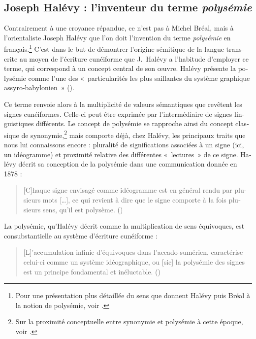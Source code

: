 \documentclass[french,output=paper,colorlinks,citecolor=brown]{../langscibook}
\begin{document}
\begin{otherlanguage}{french}
\subsection{Joseph Halévy : l’inventeur du terme \textit{polysémie}}

Contrairement à une croyance répandue, ce n’est pas à Michel Bréal, mais à l’orientaliste Joseph Halévy que l’on doit l’invention du terme \textit{polysémie} en français.\footnote{Pour une présentation plus détaillée du sens que donnent Halévy puis Bréal à la notion de polysémie, voir \citet[5–7]{Courbon2015}.} C’est dans le but de démontrer l’origine sémitique de la langue transcrite au moyen de l’écriture cunéiforme que J.~Halévy a l’habitude d’employer ce terme, qui correspond à un concept central de son œuvre. Halévy présente la polysémie comme l’une des «~particularités les plus saillantes du système graphique assyro-babylonien~» (\citealt[298]{Halévy1876}).

Ce terme renvoie alors à la multiplicité de valeurs sémantiques que revêtent les signes cunéiformes. Celle-ci peut être exprimée par l’intermédiaire de signes linguistiques différents. Le concept de polysémie se rapproche ainsi du concept classique de synonymie,\footnote{Sur la proximité conceptuelle entre synonymie et polysémie à cette époque, voir \citet{Delesalle1986}.} mais comporte déjà, chez Halévy, les principaux traits que nous lui connaissons encore : pluralité de significations associées à un signe (ici, un idéogramme) et proximité relative des différentes «~lectures~» de ce signe. Halévy décrit sa conception de la polysémie dans une communication donnée en 1878 :

\begin{quote}
[C]haque signe envisagé comme idéogramme est en général rendu par plusieurs mots […], ce qui revient à dire que le signe comporte à la fois plusieurs sens, qu’il est polysème. (\citealt[275]{Halévy1883})
\end{quote}

La polysémie, qu’Halévy décrit comme la multiplication de sens équivoques, est consubstantielle au système d’écriture cunéiforme :

\begin{quote}
    [L]’accumulation infinie d’équivoques dans l’accado-sumérien, caractérise celui-ci comme un système idéographique, ou [sic] la polysémie des signes est un principe fondamental et inéluctable. (\citealt[276]{Halévy1883})
\end{quote}


\end{otherlanguage}
\end{document}

